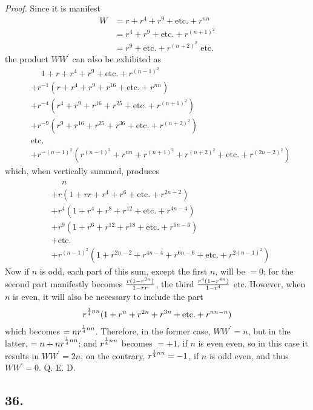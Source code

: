 \documentclass[twoside,12pt, showframe]{memoir}
\let\oldfrac\frac
\def\frac#1#2{\mathchoice{\tfrac{#1}{#2}}{\oldfrac{#1}{#2}}{\genfrac{}{}{}{2}{#1}{#2\mathstrut}}{\genfrac{}{}{}{3}{#1}{#2\mathstrut}}}
\begin{document}
\textit{Proof.} Since it is manifest
\[\begin{aligned}
W & =r+r^{4}+r^{9}+\text{etc.}+r^{n n} \\
& =r^{4}+r^{9}+\text{etc.}+r^{(n+1)^{2}} \\
& =r^{9}+\text{etc.}+r^{(n+2)^{2}} \text{ etc.}
\end{aligned}\]
the product \(W {W}^{\prime}\) can also be exhibited as
\[\begin{aligned}
&\phantom{ +, } 1+r+r^{4}+r^{9}+\text{etc.}+r^{(n-1)^{2}} \\
&+ r^{-1}(r+r^{4}+r^{9}+r^{16}+\text{etc.}+r^{n n}) \\
&+ r^{-4}(r^{4}+r^{9}+r^{16}+r^{25}+\text{etc.}+r^{(n+1)^{2}}) \\
&+ r^{-9}(r^{9}+r^{16}+r^{25}+r^{36}+\text{etc.}+r^{(n+2)^{2}}) \\
&\text{etc.} \\
&+ r^{-(n-1)^{2}}(r^{(n-1)^{2}}+r^{n n}+r^{(n+1)^{2}}+r^{(n+2)^{2}}+\text{etc.}+r^{(2 n-2)^{2}})
\end{aligned}\]
which, when vertically summed, produces
\[\begin{aligned}
&\phantom{+}n \\
&+r(1+r r+r^{4}+r^{6}+\text{etc.}+r^{2 n-2}) \\
&+r^{4}(1+r^{4}+r^{8}+r^{12}+\text{etc.}+r^{4 n-4}) \\
&+r^{9}(1+r^{6}+r^{12}+r^{18}+\text{etc.}+r^{6 n-6}) \\
&+\text{etc.} \\
&+r^{(n-1)^{2}}(1+r^{2 n-2}+r^{4 n-4}+r^{6 n-6}+\text{etc.}+r^{2(n-1)^{2}})
\end{aligned}\]
Now if \(n\) is odd, each part of this sum, except the first \(n\), will be \(=0\); for the second part manifestly becomes \(\frac{r(1-r^{2 n})}{1-r r}\), the third \(\frac{r^{4}(1-r^{4 n})}{1-r^{4}}\) etc. However, when \(n\) is even, it will also be necessary to include the part\clearpage\noindent%
\[r^{\frac{1}{4} n n}(1+r^{n}+r^{2 n}+r^{3 n}+\text{etc.}+r^{n n-n})\]
which becomes \(=n r^{\frac{1}{4} n n}\). Therefore, in the former case, \(W W^{\prime}=n\), but in the latter, \(=n+n r^{\frac{1}{4} n n}\); and \(r^{\frac{1}{4} n n}\) becomes \(=+1\), if \(n\) is even even, so in this case it results in \(W W^{\prime}=2 n\); on the contrary, \(r^{\frac{1}{4} n n}=-1\), if \(n\) is odd even, and thus \(W W^{\prime}=0\). Q. E. D.
%

\subsection*{36.}
\end{document}
